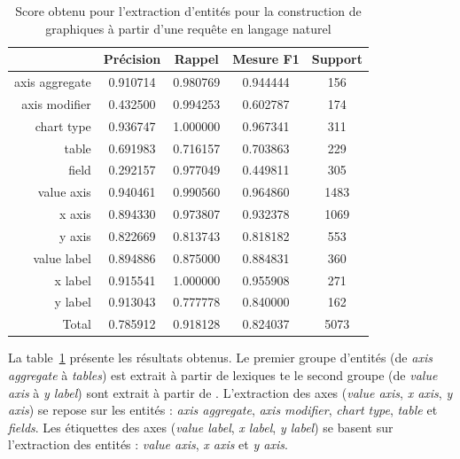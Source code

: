 \begin{table}[htb]
    \centering
    \begin{tabular}{r|cccc}
                       & Précision      & Rappel         & Mesure F1      & Support    \\
        \hline
        \hline
        axis aggregate & \num{0,910714} & \num{0,980769} & \num{0,944444} & \num{ 156} \\
        axis modifier  & \num{0,432500} & \num{0,994253} & \num{0,602787} & \num{ 174} \\
        chart type     & \num{0,936747} & \num{1,000000} & \num{0,967341} & \num{ 311} \\
        table          & \num{0,691983} & \num{0,716157} & \num{0,703863} & \num{ 229} \\
        field          & \num{0,292157} & \num{0,977049} & \num{0,449811} & \num{ 305} \\
        \hline
        value axis     & \num{0,940461} & \num{0,990560} & \num{0,964860} & \num{1483} \\
        x axis         & \num{0,894330} & \num{0,973807} & \num{0,932378} & \num{1069} \\
        y axis         & \num{0,822669} & \num{0,813743} & \num{0,818182} & \num{ 553} \\
        value label    & \num{0,894886} & \num{0,875000} & \num{0,884831} & \num{ 360} \\
        x label        & \num{0,915541} & \num{1.000000} & \num{0,955908} & \num{ 271} \\
        y label        & \num{0,913043} & \num{0,777778} & \num{0,840000} & \num{ 162} \\
        \hline
        Total          & \num{0,785912} & \num{0,918128} & \num{0,824037} & \num{5073}
    \end{tabular}
    \caption[Score obtenu pour l'extraction d'entités pour la construction de graphiques]{Score obtenu pour l'extraction d'entités pour la construction de graphiques à partir d'une requête en langage naturel}
    \label{tab:nl-query:result-dashboard}
\end{table}

La table~\ref{tab:nl-query:result-dashboard} présente les résultats obtenus.
Le premier groupe d'entités (de \emph{axis aggregate} à \emph{tables}) est extrait à partir de lexiques te le second groupe (de \emph{value axis} à \emph{y label}) sont extrait à partir de .
L'extraction des axes (\emph{value axis}, \emph{x axis}, \emph{y axis}) se repose sur les entités : \emph{axis aggregate}, \emph{axis modifier}, \emph{chart type}, \emph{table} et \emph{fields}.
Les étiquettes des axes (\emph{value label}, \emph{x label}, \emph{y label}) se basent sur l'extraction des entités : \emph{value axis}, \emph{x axis} et \emph{y axis}.

